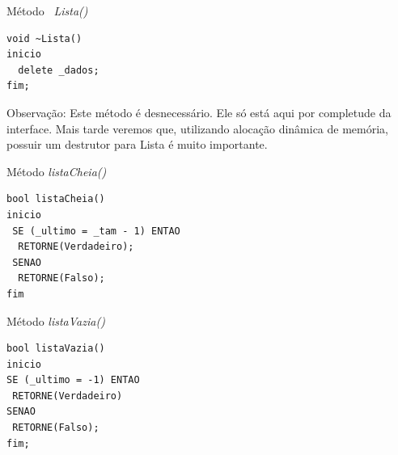 \documentclass[12pt,table,xcolor={dvipsnames}]{beamer}
\begin{document}
\begin{frame}[fragile]{Método \textit{~Lista()}}
\begin{lstlisting}
void ~Lista()
inicio
  delete _dados;
fim;
\end{lstlisting}
\begin{block}{Observação:}
Este método é desnecessário. Ele só está aqui por completude da interface. Mais tarde veremos que, utilizando alocação dinâmica de memória, possuir um destrutor para  Lista é muito importante. 
\end{block}
\end{frame}


\begin{frame}[fragile]{Método \textit{listaCheia()}}
\begin{lstlisting}
bool listaCheia()
inicio
 SE (_ultimo = _tam - 1) ENTAO
  RETORNE(Verdadeiro);
 SENAO
  RETORNE(Falso);
fim
\end{lstlisting}
\end{frame}

\begin{frame}[fragile]{Método \textit{listaVazia()}}
\begin{lstlisting}
bool listaVazia()
inicio
SE (_ultimo = -1) ENTAO
 RETORNE(Verdadeiro)
SENAO
 RETORNE(Falso);
fim;
\end{lstlisting}
\end{frame}
\end{document}
